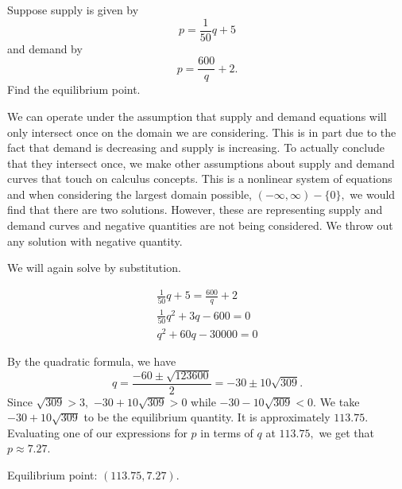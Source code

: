 \begin{example}
    Suppose supply is given by
    \[p = \frac{1}{50}q + 5\]
    and demand by
    \[ p = \frac{600}{q} + 2.\]
    Find the equilibrium point.

    \begin{solution}
        We can operate under the assumption that supply and demand equations will only intersect once on the domain we are considering. This is in part due to the fact that demand is decreasing and supply is increasing. To actually conclude that they intersect once, we make other assumptions about supply and demand curves that touch on calculus concepts. This is a nonlinear system of equations and when considering the largest domain possible, \((-\infty,\infty) - \{0\},\) we would find that there are two solutions. However, these are representing supply and demand curves and negative quantities are not being considered. We throw out any solution with negative quantity.

        We will again solve by substitution.

        \begin{gather*}
            \frac{1}{50}q + 5 = \frac{600}{q} + 2 \\
            \frac{1}{50}q^2+3q -600 = 0 \\
            q^2 + 60q - 30000=0
        \end{gather*}

        By the quadratic formula, we have \[q = \frac{-60 \pm \sqrt{123600}}{2} = -30\pm10\sqrt{309}.\] Since \(\sqrt{309} > 3,\) \(-30 + 10\sqrt{309} >0\) while \(-30 - 10\sqrt{309}<0.\) We take \(-30 + 10\sqrt{309}\) to be the equilibrium quantity. It is approximately \(113.75.\) Evaluating one of our expressions for \(p\) in terms of \(q\) at \(113.75,\) we get that \(p \approx 7.27.\)

        Equilibrium point: \((113.75, 7.27).\)
    \end{solution}
\end{example}